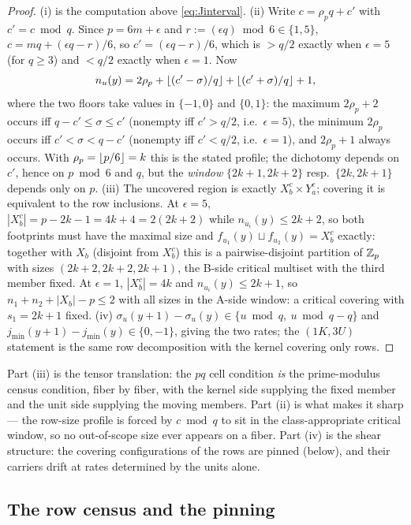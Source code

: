 \begin{proof}
(i) is the computation above \eqref{eq:Jinterval}. (ii) Write
$c=\rho_p q+c'$ with $c'=c\bmod q$. Since $p=6m+\epsilon$ and
$r:=(\epsilon q)\bmod 6\in\{1,5\}$,
$c=mq+(\epsilon q-r)/6$, so $c'=(\epsilon q-r)/6$, which is $>q/2$ exactly
when $\epsilon=5$ (for $q\ge 3$) and $<q/2$ exactly when $\epsilon=1$. Now
\[
n_u(y)=2\rho_p+\left\lfloor (c'-\sigma)/q \right\rfloor+\left\lfloor (c'+\sigma)/q \right\rfloor+1,
\]
where the two floors take values in $\{-1,0\}$ and $\{0,1\}$: the maximum
$2\rho_p+2$ occurs iff $q-c'\le\sigma\le c'$ (nonempty iff $c'>q/2$, i.e.\
$\epsilon=5$), the minimum $2\rho_p$ occurs iff
$c'<\sigma<q-c'$ (nonempty iff $c'<q/2$, i.e.\ $\epsilon=1$), and
$2\rho_p+1$ always occurs. With $\rho_p=\left\lfloor p/6 \right\rfloor=k$ this is the stated
profile; the dichotomy depends on $c'$, hence on $p\bmod 6$ and $q$, but the
\emph{window} $\{2k{+}1,2k{+}2\}$ resp.\ $\{2k,2k{+}1\}$ depends only on
$p$. (iii) The uncovered region is exactly $X_b^c\times Y_a^c$; covering it
is equivalent to the row inclusions. At $\epsilon=5$,
$|X_b^{c}|=p-2k-1=4k+4=2(2k+2)$ while $n_{u_i}(y)\le 2k+2$, so both
footprints must have the maximal size and
$f_{u_1}(y)\sqcup f_{u_2}(y)=X_b^{c}$ exactly: together with $X_b$ (disjoint
from $X_b^{c}$) this is a pairwise-disjoint partition of $\mathbb{Z}_p$ with sizes
$(2k+2,2k+2,2k+1)$, the B-side critical multiset with the third member fixed.
At $\epsilon=1$, $|X_b^{c}|=4k$ and $n_{u_i}(y)\le 2k+1$, so
$n_1+n_2+|X_b|-p\le 2$ with all sizes in the A-side window: a critical
covering with $s_1=2k+1$ fixed. (iv) $\sigma_u(y{+}1)-\sigma_u(y)\in\{u
\bmod q,\ u\bmod q-q\}$ and $j_{\min}(y{+}1)-j_{\min}(y)\in\{0,-1\}$, giving
the two rates; the $(1K,3U)$ statement is the same row decomposition with the
kernel covering only rows.
\end{proof}

Part (iii) is the tensor translation: the $pq$ cell condition \emph{is} the
prime-modulus census condition, fiber by fiber, with the kernel side
supplying the fixed member and the unit side supplying the moving members.
Part (ii) is what makes it sharp --- the row-size profile is forced by
$c\bmod q$ to sit in the class-appropriate critical window, so no
out-of-scope size ever appears on a fiber. Part (iv) is the shear structure:
the covering configurations of the rows are pinned (below), and their
carriers drift at rates determined by the units alone.

\subsection{The row census and the pinning}\label{sec:pq-census}

